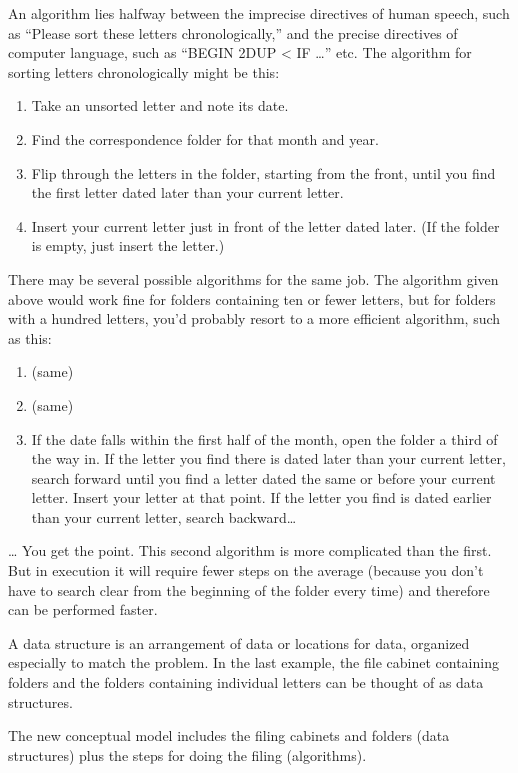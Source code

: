 An algorithm lies halfway between the imprecise directives of
human speech, such as ``Please sort these letters chronologically,'' and the
precise directives of computer language, such as ``BEGIN 2DUP < IF \dots{}''
etc. The algorithm for sorting letters chronologically might be this:
\begin{enumerate}
\item Take an unsorted letter and note its date.
\item Find the correspondence folder for that month and year.
\item Flip through the letters in the folder, starting from the front, until
   you find the first letter dated later than your current letter.
\item Insert your current letter just in front of the letter dated later.
   (If the folder is empty, just insert the letter.)
\end{enumerate}
There may be several possible algorithms for the same job. The algorithm
given above would work fine for folders containing ten or fewer letters,
but for folders with a hundred letters, you'd probably resort to a more
efficient algorithm, such as this:
\begin{enumerate}
\item (same)
\item (same)
\item If the date falls within the first half of the month, open the folder a
   third of the way in. If the letter you find there is dated later than your
   current letter, search forward until you find a letter dated the same or
   before your current letter. Insert your letter at that point. If the letter
   you find is dated earlier than your current letter, search backward\dots{}
\end{enumerate}
\dots{} You get the point. This second algorithm is more complicated than
the first. But in execution it will require fewer steps on the average
(because you don't have to search clear from the beginning of the folder
every time) and therefore can be performed faster.

A data structure is an arrangement of data or locations for data,
organized especially to match the problem. In the last example, the file
cabinet containing folders and the folders containing individual letters
can be thought of as data structures.

The new conceptual model includes the filing cabinets and folders
(data structures) plus the steps for doing the filing (algorithms).

